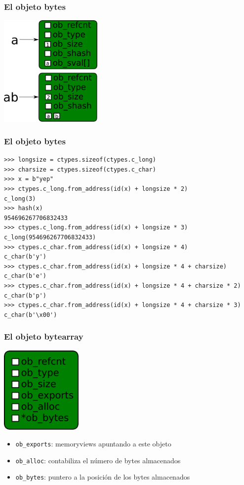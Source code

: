 \documentclass[10pt]{beamer}
\begin{document}
  \begin{frame}[containsverbatim]
    \frametitle{El objeto bytes}
    \begin{center}\includegraphics[width=5cm]{img/Bytes-Usage.png}\end{center}
  \end{frame}

  \begin{frame}[containsverbatim]
    \frametitle{El objeto bytes}
    \begin{verbatim}
>>> longsize = ctypes.sizeof(ctypes.c_long)
>>> charsize = ctypes.sizeof(ctypes.c_char)
>>> x = b"yep"
>>> ctypes.c_long.from_address(id(x) + longsize * 2)
c_long(3)
>>> hash(x)
954696267706832433
>>> ctypes.c_long.from_address(id(x) + longsize * 3)
c_long(954696267706832433)
>>> ctypes.c_char.from_address(id(x) + longsize * 4)
c_char(b'y')
>>> ctypes.c_char.from_address(id(x) + longsize * 4 + charsize)
c_char(b'e')
>>> ctypes.c_char.from_address(id(x) + longsize * 4 + charsize * 2)
c_char(b'p')
>>> ctypes.c_char.from_address(id(x) + longsize * 4 + charsize * 3)
c_char(b'\x00')
    \end{verbatim}
  \end{frame}


  \begin{frame}[containsverbatim]
    \frametitle{El objeto bytearray}
    \begin{center}\includegraphics[width=4cm]{img/Bytearray.png}\end{center}
    \begin{itemize}
      \item \verb+ob_exports+: memoryviews apuntando a este objeto
      \item \verb+ob_alloc+: contabiliza el número de bytes almacenados
      \item \verb+ob_bytes+: puntero a la posición de los bytes almacenados
    \end{itemize}
  \end{frame}
\end{document}
